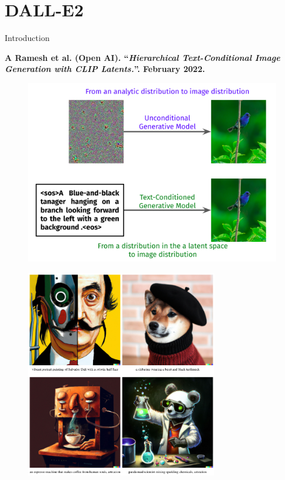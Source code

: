\documentclass[aspectratio=169, 10pt]{beamer}
\theoremstyle{definition}
\begin{document}
\section{DALL-E2}
\begin{frame}{Introduction}
  \begin{center}
    \bf
    A Ramesh et al. (Open AI). ``\textit{Hierarchical Text-Conditional Image 
    Generation with CLIP Latents.}''. February 2022.
  \end{center}
  \begin{minipage}[t]{0.5\textwidth}
  \begin{figure}[h!]
    \centering
    \includegraphics[width=\textwidth]{./pic/dalle-intro.png}
  \end{figure}
  \end{minipage}\hfill%
  \begin{minipage}[t]{0.5\textwidth}
    \begin{figure}[h]
      \centering
      \includegraphics[width=0.75\textwidth]{./pic/dalle-samples.png}
    \end{figure}
  \end{minipage}
\end{frame}
\end{document}
